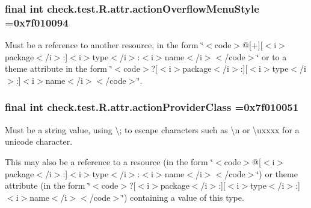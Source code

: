 \subsubsection[{action\+Overflow\+Menu\+Style}]{\setlength{\rightskip}{0pt plus 5cm}final int check.\+test.\+R.\+attr.\+action\+Overflow\+Menu\+Style =0x7f010094\hspace{0.3cm}{\ttfamily [static]}}\label{classcheck_1_1test_1_1_r_1_1attr_adf07fdf83e0f7e3666ca3c62d9051738}
Must be a reference to another resource, in the form \char`\"{}$<$code$>$@\mbox{[}+\mbox{]}\mbox{[}$<$i$>$package$<$/i$>$\+:\mbox{]}$<$i$>$type$<$/i$>$\+:$<$i$>$name$<$/i$>$$<$/code$>$\char`\"{} or to a theme attribute in the form \char`\"{}$<$code$>$?\mbox{[}$<$i$>$package$<$/i$>$\+:\mbox{]}\mbox{[}$<$i$>$type$<$/i$>$\+:\mbox{]}$<$i$>$name$<$/i$>$$<$/code$>$\char`\"{}. \hypertarget{classcheck_1_1test_1_1_r_1_1attr_acf3e8e893c96f1ce1d297389b1eaf8af}{}
\subsubsection[{action\+Provider\+Class}]{\setlength{\rightskip}{0pt plus 5cm}final int check.\+test.\+R.\+attr.\+action\+Provider\+Class =0x7f010051\hspace{0.3cm}{\ttfamily [static]}}\label{classcheck_1_1test_1_1_r_1_1attr_acf3e8e893c96f1ce1d297389b1eaf8af}
Must be a string value, using \textquotesingle{}\textbackslash{};\textquotesingle{} to escape characters such as \textquotesingle{}\textbackslash{}n\textquotesingle{} or \textquotesingle{}\textbackslash{}uxxxx\textquotesingle{} for a unicode character. 

This may also be a reference to a resource (in the form \char`\"{}$<$code$>$@\mbox{[}$<$i$>$package$<$/i$>$\+:\mbox{]}$<$i$>$type$<$/i$>$\+:$<$i$>$name$<$/i$>$$<$/code$>$\char`\"{}) or theme attribute (in the form \char`\"{}$<$code$>$?\mbox{[}$<$i$>$package$<$/i$>$\+:\mbox{]}\mbox{[}$<$i$>$type$<$/i$>$\+:\mbox{]}$<$i$>$name$<$/i$>$$<$/code$>$\char`\"{}) containing a value of this type. \hypertarget{classcheck_1_1test_1_1_r_1_1attr_aabc7490f827174f67e409de2dd06c2cb}{}
